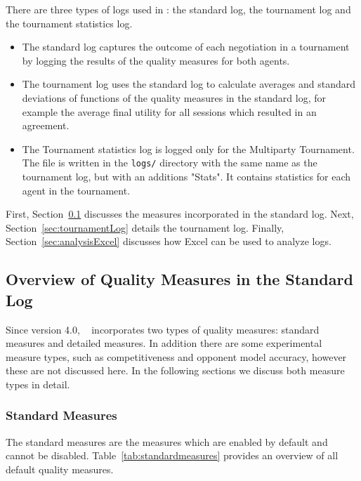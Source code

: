 \documentclass[]{article}
\begin{document}
There are  three types of logs used in \Genius: the standard log, the tournament log and the tournament statistics log.
\begin{itemize}
\item The standard log captures the outcome of each negotiation in a tournament by logging the results of the quality measures for both agents.
\item The tournament log uses the standard log to calculate averages and standard deviations of functions of the quality measures in the standard log, for example the average final utility for all sessions which resulted in an agreement.
\item The Tournament statistics log is logged only for the Multiparty Tournament. The file is written in the \verb|logs/| directory with the same name as the tournament log, but with an additions "Stats". It contains statistics for each agent in the tournament.
\end{itemize}

First, Section~\ref{sec:standardLog} discusses the measures incorporated in the standard log. Next, Section~\ref{sec:tournamentLog} details the tournament log. Finally, Section~\ref{sec:analysisExcel} discusses how Excel can be used to analyze logs.

\subsection{Overview of Quality Measures in the Standard Log}\label{sec:standardLog}
Since version 4.0, \Genius~ incorporates two types of quality measures: standard measures and detailed measures. In addition there are some experimental measure types, such as competitiveness and opponent model accuracy, however these are not discussed here. In the following sections we discuss both measure types in detail.

\subsubsection{Standard Measures}
The standard measures are the measures which are enabled by default and cannot be disabled. Table~\ref{tab:standardmeasures} provides an overview of all default quality measures.
\end{document}
